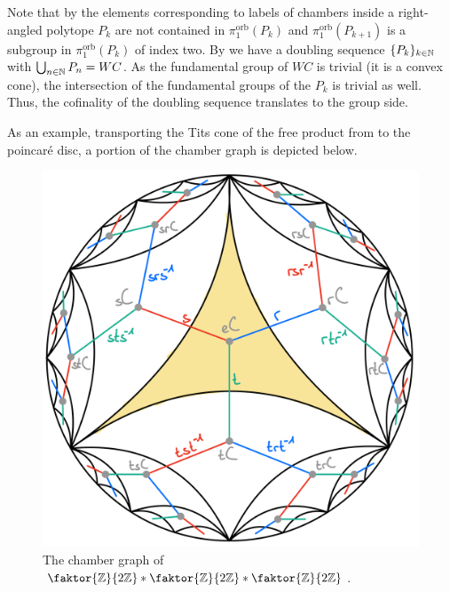 
\begin{remark}\label{rmk:groupseries}
    Note that by  the elements corresponding to labels of chambers inside a right-angled polytope \(P_k\) are not contained in \(\pi_1^{\text{orb}}(P_k)\) and \(\pi_1^{\text{orb}}(P_{k+1})\) is a subgroup in \(\pi_1^{\text{orb}}(P_k)\) of index two.
    By  we have a doubling sequence \(\{P_k\}_{k \in \mathbb{N}}\) with \(\bigcup_{n \in \mathbb{N}} P_n = WC\).
    As the fundamental group of \(WC\) is trivial (it is a convex cone), the intersection of the fundamental groups of the \(P_k\) is trivial as well.
    Thus, the cofinality of the doubling sequence translates to the group side.
\end{remark}

\begin{example}
    As an example, transporting the Tits cone of the free product from  to the poincaré disc, a portion of the chamber graph is depicted below.
    \begin{figure}[h!]
        \label{fig:chambergraphex}
        \centering
        \includegraphics[width=.7\textwidth]{gfx/Chamber graph.png}
        \caption{The chamber graph of \(\faktor{\Z}{2\Z} \ast \faktor{\Z}{2\Z} \ast \faktor{\Z}{2\Z}\).}
    \end{figure}
\end{example}


